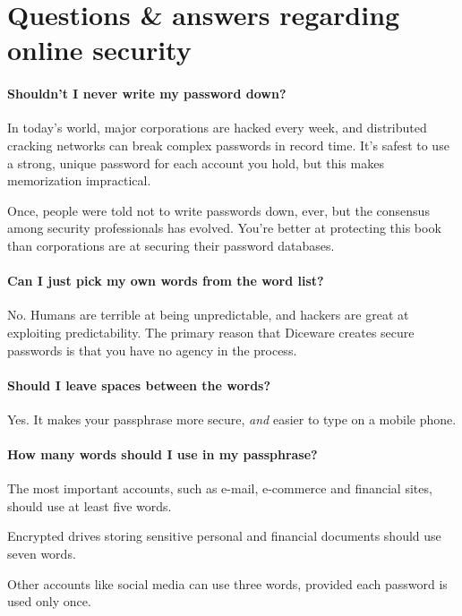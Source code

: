 \chapter*{Questions \& answers regarding online security}
\small
\label{ch:qna}

\subsubsection{Shouldn't I never write my password down?}

In today's world, major corporations are hacked every week, and distributed cracking networks can break complex passwords in record time. It's safest to use a strong, unique password for each account you hold, but this makes memorization impractical. 

Once, people were told not to write passwords down, ever, but the consensus among security professionals has evolved. You're better at protecting this book than corporations are at securing their password databases. 

\subsubsection{Can I just pick my own words from the word list?}

No. Humans are terrible at being unpredictable, and hackers are great at exploiting predictability. The primary reason that Diceware creates secure passwords is that you have no agency in the process.

\subsubsection{Should I leave spaces between the words?}

Yes. It makes your passphrase more secure, \textit{and} easier to type on a mobile phone.

\subsubsection{How many words should I use in my passphrase?}

The most important accounts, such as e-mail, e-commerce and financial sites, should use at least five words.

Encrypted drives storing sensitive personal and financial documents should use seven words.

Other accounts like social media can use three words, provided each password is used only once.

